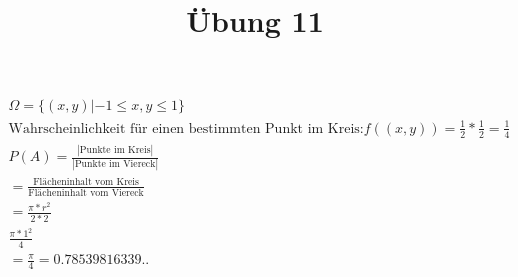 \documentclass[]{article}
\title{Übung 11}
\author{}
\date{}
\begin{document}
\maketitle



\section{}
\begin{gather*}
	\Omega = \{(x,y) | -1 \leq x,y \leq 1\} \\
	\text{Wahrscheinlichkeit für einen bestimmten Punkt im Kreis:} f((x,y))= \frac{1}{2}*\frac{1}{2} = \frac{1}{4} \\
		P (A) = \frac{|\text{Punkte im Kreis}|}{|\text{Punkte im Viereck}|} \\
	 = \frac{\text{Flächeninhalt vom Kreis}}{\text{Flächeninhalt vom Viereck}}\\
	 =\frac{\pi * r^2}{2* 2} \\
	 \frac{\pi * 1^2}{4}\\
	 = \frac{\pi}{4} = 0.78539816339..	
\end{gather*}
\end{document}

